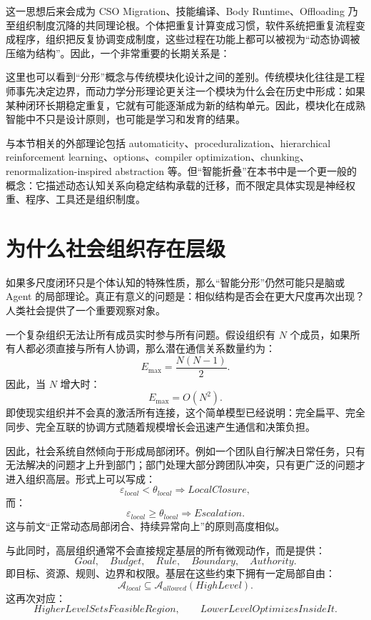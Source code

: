 这一思想后来会成为 CSO Migration、技能编译、Body Runtime、Offloading 乃至组织制度沉降的共同理论根。个体把重复计算变成习惯，软件系统把重复流程变成程序，组织把反复协调变成制度，这些过程在功能上都可以被视为“动态协调被压缩为结构”。因此，一个非常重要的长期关系是：
\begin{statementbox}
\centering
{}
\end{statementbox}

这里也可以看到“分形”概念与传统模块化设计之间的差别。传统模块化往往是工程师事先决定边界，而动力学分形理论更关注一个模块为什么会在历史中形成：如果某种闭环长期稳定重复，它就有可能逐渐成为新的结构单元。因此，模块化在成熟智能中不只是设计原则，也可能是学习和发育的结果。

与本节相关的外部理论包括 automaticity、proceduralization、hierarchical reinforcement learning、options、compiler optimization、chunking、renormalization-inspired abstraction 等。但“智能折叠”在本书中是一个更一般的概念：它描述动态认知关系向稳定结构承载的迁移，而不限定具体实现是神经权重、程序、工具还是组织制度。

\section{为什么社会组织存在层级}

如果多尺度闭环只是个体认知的特殊性质，那么“智能分形”仍然可能只是脑或 Agent 的局部理论。真正有意义的问题是：相似结构是否会在更大尺度再次出现？人类社会提供了一个重要观察对象。

一个复杂组织无法让所有成员实时参与所有问题。假设组织有 $N$ 个成员，如果所有人都必须直接与所有人协调，那么潜在通信关系数量约为：
\[
E_{\max}
=
\frac{N(N-1)}{2}.
\]
因此，当 $N$ 增大时：
\[
E_{\max}
=
O(N^2).
\]
即使现实组织并不会真的激活所有连接，这个简单模型已经说明：完全扁平、完全同步、完全互联的协调方式随着规模增长会迅速产生通信和决策负担。

因此，社会系统自然倾向于形成局部闭环。例如一个团队自行解决日常任务，只有无法解决的问题才上升到部门；部门处理大部分跨团队冲突，只有更广泛的问题才进入组织高层。形式上可以写成：
\[
\varepsilon_{local}
<
\theta_{local}
\Rightarrow
LocalClosure,
\]
而：
\[
\varepsilon_{local}
\geq
\theta_{local}
\Rightarrow
Escalation.
\]
这与前文“正常动态局部闭合、持续异常向上”的原则高度相似。

与此同时，高层组织通常不会直接规定基层的所有微观动作，而是提供：
\[
Goal,\quad Budget,\quad Rule,\quad Boundary,\quad Authority.
\]
即目标、资源、规则、边界和权限。基层在这些约束下拥有一定局部自由：
\[
\mathcal A_{local}
\subseteq
\mathcal A_{allowed}(HighLevel).
\]
这再次对应：
\[
HigherLevelSetsFeasibleRegion,
\qquad
LowerLevelOptimizesInsideIt.
\]

